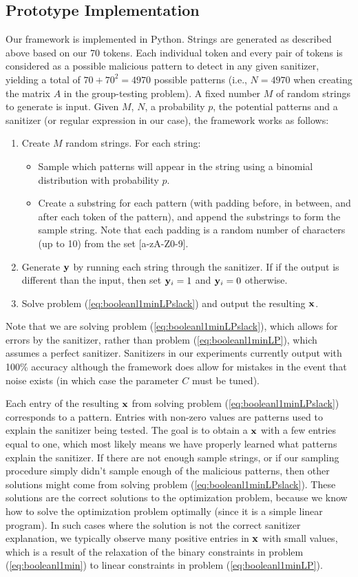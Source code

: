 \subsection{Prototype Implementation}
Our framework is implemented in Python. Strings are generated as described above based on our 70 tokens. Each individual token and every pair of tokens is considered as a possible malicious pattern to detect in any given sanitizer, yielding a total of $70+70^2=4970$ possible patterns (i.e., $N=4970$ when creating the matrix $A$ in the group-testing problem). A fixed number $M$ of random strings to generate is input. Given $M$, $N$, a probability $p$, the potential patterns and a sanitizer (or regular expression in our case), the framework works as follows:
\begin{enumerate}
	\item Create $M$ random strings. For each string:
		\begin{itemize}
			\item Sample which patterns will appear in the string using a binomial distribution with probability $p$.
			\item Create a substring for each pattern (with padding before, in between, and after each token of the pattern), and append the substrings to form the sample string. Note that each padding is a random number of characters (up to 10) from the set [a-zA-Z0-9].
		\end{itemize}
	\item Generate $\mathbf{y}$ by running each string through the sanitizer. If if the output is different than the input, then set $\mathbf{y}_i=1$ and $\mathbf{y}_i=0$ otherwise.
	\item Solve problem (\ref{eq:booleanl1minLPslack}) and output the resulting $\mathbf{x}$.
\end{enumerate}
Note that we are solving problem (\ref{eq:booleanl1minLPslack}), which allows for errors by the sanitizer, rather than problem (\ref{eq:booleanl1minLP}), which assumes a perfect sanitizer. Sanitizers in our experiments currently output with 100\% accuracy although the framework does allow for mistakes in the event that noise exists (in which case the parameter $C$ must be tuned).

Each entry of the resulting $\mathbf{x}$ from solving problem (\ref{eq:booleanl1minLPslack}) corresponds to a pattern.  Entries with non-zero values are patterns used to explain the sanitizer being tested. The goal is to obtain a $\mathbf{x}$ with a few entries equal to one, which most likely means we have properly learned what patterns explain the sanitizer. If there are not enough sample strings, or if our sampling procedure simply didn't sample enough of the malicious patterns, then other solutions might come from solving problem (\ref{eq:booleanl1minLPslack}). These solutions are the correct solutions to the optimization problem, because we know how to solve the optimization problem optimally (since it is a simple linear program). In such cases where the solution is not the correct sanitizer explanation, we typically observe many positive entries in $\mathbf{x}$ with small values, which is a result of the relaxation of the binary constraints in problem (\ref{eq:booleanl1min}) to linear constraints in problem (\ref{eq:booleanl1minLP}).

